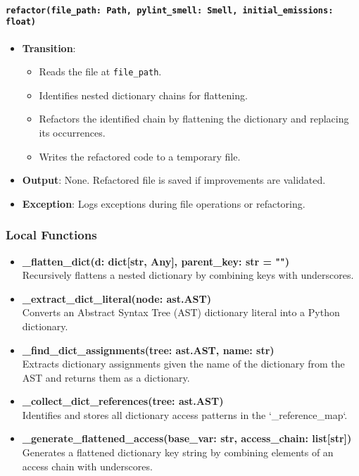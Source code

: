 \documentclass[12pt, titlepage]{article}
\begin{document}
\paragraph{\texttt{refactor(file\_path: Path, pylint\_smell: Smell, initial\_emissions: float)}}
\begin{itemize}
  \item \textbf{Transition}:
    \begin{itemize}
      \item Reads the file at \texttt{file\_path}.
      \item Identifies nested dictionary chains for flattening.
      \item Refactors the identified chain by flattening the dictionary and replacing its occurrences.
      \item Writes the refactored code to a temporary file.
\end{itemize}
  \item \textbf{Output}: None. Refactored file is saved if improvements are validated.
  \item \textbf{Exception}: Logs exceptions during file operations or refactoring.
\end{itemize}

\subsubsection{Local Functions}
\begin{itemize}
    \item \textbf{\_flatten\_dict(d: dict[str, Any], parent\_key: str = "")} \\
    Recursively flattens a nested dictionary by combining keys with underscores.

    \item \textbf{\_extract\_dict\_literal(node: ast.AST)} \\
    Converts an Abstract Syntax Tree (AST) dictionary literal into a Python dictionary.

    \item \textbf{\_find\_dict\_assignments(tree: ast.AST, name: str)} \\
    Extracts dictionary assignments given the name of the dictionary from the AST and returns them as a dictionary.

    \item \textbf{\_collect\_dict\_references(tree: ast.AST)} \\
    Identifies and stores all dictionary access patterns in the `\_reference\_map`.

    \item \textbf{\_generate\_flattened\_access(base\_var: str, access\_chain: list[str])} \\
    Generates a flattened dictionary key string by combining elements of an access chain with underscores.
\end{itemize}
\end{document}
